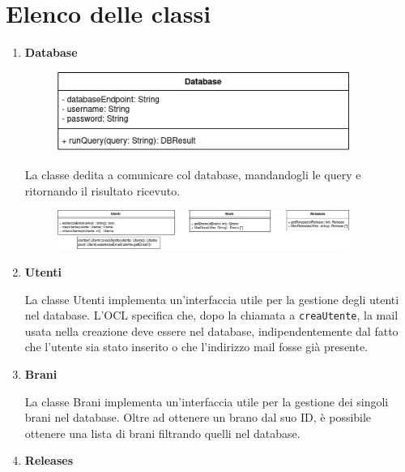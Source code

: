 \documentclass[a4paper,12pt]{article}
\begin{document}
\newpage
\section{Elenco delle classi}

\begin{enumerate}
    \item \label{database} \textbf{Database}
    
    \begin{figure}[htp]
        \centering
        \includegraphics[width=0.9\textwidth]{diagrams/class-database.png}
    \end{figure}

    La classe dedita a comunicare col database, mandandogli le query e ritornando il risultato ricevuto.

    \begin{figure}[htp]
        \centering
        \includegraphics[width=0.9\textwidth]{diagrams/class-odm.png}
    \end{figure}

    \item \label{utenti} \textbf{Utenti}

    La classe Utenti implementa un'interfaccia utile per la gestione degli utenti nel database. L'OCL specifica che, dopo la chiamata a \texttt{creaUtente}, la mail usata nella creazione deve essere nel database, indipendentemente dal fatto che l'utente sia stato inserito o che l'indirizzo mail fosse già presente.

    \item \label{brani} \textbf{Brani}

    La classe Brani implementa un'interfaccia utile per la gestione dei singoli brani nel database. Oltre ad ottenere un brano dal suo ID, è possibile ottenere una lista di brani filtrando quelli nel database.

    \item \label{releases} \textbf{Releases}


\end{enumerate}
\end{document}
